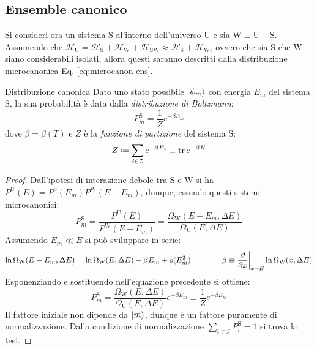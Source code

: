 \subsection{Ensemble canonico}

Si consideri ora un sistema $ \text{S} $ al'interno dell'universo $ \text{U} $ e sia $ \text{W} \equiv \text{U} - \text{S} $. Assumendo che $ \mathcal{H}_\text{U} = \mathcal{H}_\text{S} + \mathcal{H}_\text{W} + \mathcal{H}_\text{SW} \approx \mathcal{H}_\text{S} + \mathcal{H}_\text{W} $, ovvero che sia $ \text{S} $ che $ \text{W} $ siano considerabili isolati, allora questi saranno descritti dalla distribuzione microcanonica Eq. \ref{eq:microcanon-ens}.

\begin{theorem}{Distribuzione canonica}{}
	Dato uno stato possibile $ \ket{\psi_m} $ con energia $ E_m $ del sistema $ \text{S} $, la sua probabilità è data dalla \textit{distribuzione di Boltzmann}:
	\begin{equation}
		P_m^\text{S} = \frac{1}{Z} e^{- \beta E_m}
	\end{equation}
	dove $ \beta = \beta(T) $ e $ Z $ è la \textit{funzione di partizione} del sistema $ \text{S} $:
	\begin{equation}
		Z \defeq \sum_{i \in \mathcal{I}} e^{- \beta E_i} \equiv \tr e^{- \beta \mathcal{H}}
		\label{eq:part-func-states}
	\end{equation}

	\tcblower

	\begin{proof}
		Dall'ipotesi di interazione debole tra $ \text{S} $ e $ \text{W} $ si ha $ P^\text{U}(E) = P^\text{S}(E_m) P^\text{W}(E - E_m) $, dunque, essendo questi sistemi microcanonici:
		\begin{equation*}
			P_m^\text{S} = \frac{P^\text{U}(E)}{P^\text{W}(E-E_m)} = \frac{\Omega_\text{W}(E-E_m,\Delta E)}{\Omega_\text{U}(E,\Delta E)}
		\end{equation*}
		Assumendo $ E_m \ll E $ si può sviluppare in serie:
		\begin{equation*}
			\ln \Omega_\text{W}(E - E_m , \Delta E) = \ln \Omega_\text{W}(E , \Delta E) - \beta E_m + o(E_m^2)
			\qquad \qquad
			\beta \equiv \frac{\partial}{\partial x}\bigg\vert_{x = E} \ln \Omega_\text{W}(x , \Delta E)
		\end{equation*}
		Esponenziando e sostituendo nell'equazione precedente si ottiene:
		\begin{equation*}
			P_m^\text{S} = \frac{\Omega_\text{W}(E , \Delta E)}{\Omega_\text{U}(E, \Delta E)} e^{- \beta E_m} \equiv \frac{1}{Z} e^{- \beta E_m}
		\end{equation*}
		Il fattore iniziale non dipende da $ \ket{m} $, dunque è un fattore puramente di normalizzazione. Dalla condizione di normalizzazione $ \sum_{i \in \mathcal{I}} P_i^\text{S} = 1 $ si trova la tesi.
	\end{proof}
\end{theorem}

